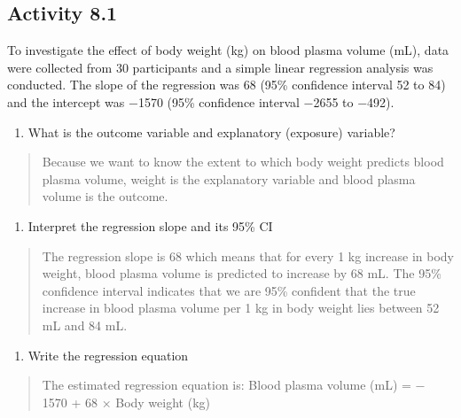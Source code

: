\documentclass[
]{memoir}
\providecommand{\tightlist}{%
  \setlength{\itemsep}{0pt}\setlength{\parskip}{0pt}}
\begin{document}
\hypertarget{activity-8.1}{%
\subsection*{Activity 8.1}\label{activity-8.1}}

To investigate the effect of body weight (kg) on blood plasma volume (mL), data were collected from 30 participants and a simple linear regression analysis was conducted. The slope of the regression was 68 (95\% confidence interval 52 to 84) and the intercept was −1570 (95\% confidence interval −2655 to −492).

\begin{enumerate}
\def\labelenumi{\alph{enumi})}
\tightlist
\item
  What is the outcome variable and explanatory (exposure) variable?
\end{enumerate}

\begin{quote}
Because we want to know the extent to which body weight predicts blood plasma volume, weight is the explanatory variable and blood plasma volume is the outcome.
\end{quote}

\begin{enumerate}
\def\labelenumi{\alph{enumi})}
\setcounter{enumi}{1}
\tightlist
\item
  Interpret the regression slope and its 95\% CI
\end{enumerate}

\begin{quote}
The regression slope is 68 which means that for every 1 kg increase in body weight, blood plasma volume is predicted to increase by 68 mL. The 95\% confidence interval indicates that we are 95\% confident that the true increase in blood plasma volume per 1 kg in body weight lies between 52 mL and 84 mL.
\end{quote}

\begin{enumerate}
\def\labelenumi{\alph{enumi})}
\setcounter{enumi}{2}
\tightlist
\item
  Write the regression equation
\end{enumerate}

\begin{quote}
The estimated regression equation is: Blood plasma volume (mL) = − 1570 + 68 × Body weight (kg)
\end{quote}
\end{document}
